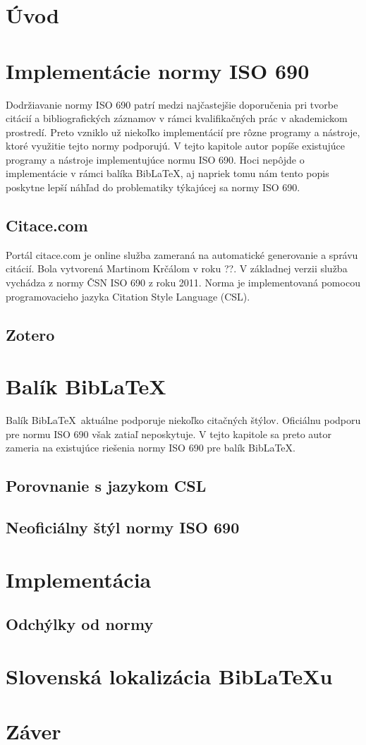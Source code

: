 \documentclass{fithesis3}
\begin{document}
\chapter{Úvod}

\chapter{Implementácie normy ISO 690}
Dodržiavanie normy ISO 690 patrí medzi najčastejšie doporučenia pri tvorbe citácií a bibliografických záznamov v rámci kvalifikačných prác v akademickom prostredí. Preto vzniklo už niekoľko implementácií pre rôzne programy a nástroje, ktoré využitie tejto normy podporujú. V tejto kapitole autor popíše existujúce programy a nástroje implementujúce normu ISO 690. Hoci nepôjde o implementácie v rámci balíka Bib\LaTeX, aj napriek tomu nám tento popis poskytne lepší náhľad do problematiky týkajúcej sa normy ISO 690.

	\section{Citace.com}
	Portál citace.com je online služba zameraná na automatické generovanie a správu citácií. Bola vytvorená Martinom Krčálom v roku ??. V základnej verzii služba vychádza z normy ČSN ISO 690 z roku 2011. Norma je implementovaná pomocou programovacieho jazyka Citation Style Language (CSL).
	\section{Zotero}
	
\chapter{Balík Bib\LaTeX}
Balík Bib\LaTeX\, aktuálne podporuje niekoľko citačných štýlov. Oficiálnu podporu pre normu ISO 690 však zatiaľ neposkytuje. V tejto kapitole sa preto autor zameria na existujúce riešenia normy ISO 690 pre balík Bib\LaTeX.

	\section{Porovnanie s jazykom CSL}
	\section{Neoficiálny štýl normy ISO 690}

\chapter{Implementácia}
	\section{Odchýlky od normy}

\chapter{Slovenská lokalizácia Bib\LaTeX u}

\chapter{Záver}
\end{document}
